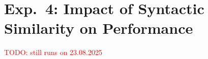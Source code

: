 \section{Exp.\ 4: Impact of Syntactic Similarity on \impApprTitle{} Performance}
\label{sec:res_syn_sim_impact}

\textcolor{red}{TODO: still runs on 23.08.2025}

%     

%     

%     

%     

%     

%     
